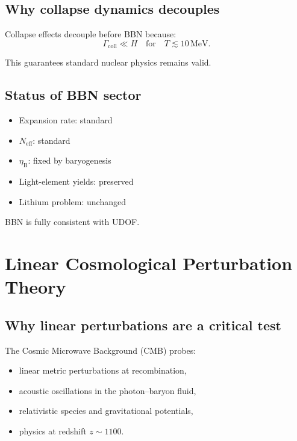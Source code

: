 \documentclass[11pt]{book}
\newcommand{\etaB}{\eta_{\mathrm{B}}}
\begin{document}
\section{Why collapse dynamics decouples}

Collapse effects decouple before BBN because:
\begin{equation}
\Gamma_{\mathrm{coll}} \ll H
\quad
\text{for}
\quad
T \lesssim 10\,\mathrm{MeV}.
\end{equation}

This guarantees standard nuclear physics remains valid.

\section{Status of BBN sector}

\begin{itemize}
\item Expansion rate: standard
\item $N_{\mathrm{eff}}$: standard
\item $\etaB$: fixed by baryogenesis
\item Light-element yields: preserved
\item Lithium problem: unchanged
\end{itemize}

BBN is fully consistent with UDOF.

\chapter{Linear Cosmological Perturbation Theory}

\section{Why linear perturbations are a critical test}

The Cosmic Microwave Background (CMB) probes:
\begin{itemize}
\item linear metric perturbations at recombination,
\item acoustic oscillations in the photon--baryon fluid,
\item relativistic species and gravitational potentials,
\item physics at redshift $z \sim 1100$.
\end{itemize}
\end{document}
